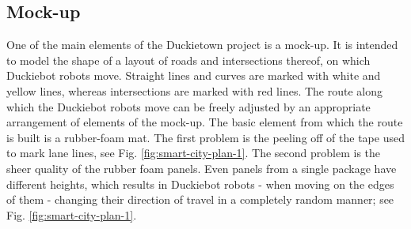 \documentclass[conference]{IEEEtran}
\begin{document}
\subsection{Mock-up}\label{subsec:plane}
One of the main elements of the Duckietown project is a mock-up. It is intended to model the shape of a layout of roads and intersections thereof, on which Duckiebot robots move. Straight lines and curves are marked with white and yellow lines, whereas intersections are marked with red lines. The route along which the Duckiebot robots move can be freely adjusted by an appropriate arrangement of elements of the mock-up. The basic element from which the route is built is a rubber-foam mat. The first problem is the peeling off of the tape used to mark lane lines, see Fig. \ref{fig:smart-city-plan-1}. The second problem is the sheer quality of the rubber foam panels. Even panels from a single package have different heights, which results in Duckiebot robots - when moving on the edges of them - changing their direction of travel in a completely random manner; see Fig. \ref{fig:smart-city-plan-1}.
\end{document}
